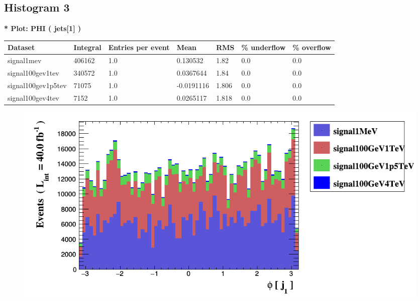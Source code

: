 \documentclass[a4paper, 10pt]{article}
\begin{document}
\subsection{ Histogram 3}

\textbf{* Plot: PHI ( jets[1] ) }\\
   \begin{table}[H]
  \begin{center}
    \begin{tabular}{|m{23.0mm}|m{23.0mm}|m{18.0mm}|m{19.0mm}|m{19.0mm}|m{19.0mm}|m{19.0mm}|}
      \hline
      {\cellcolor{yellow}         Dataset}& {\cellcolor{yellow}         Integral}& {\cellcolor{yellow}         Entries per event}& {\cellcolor{yellow}         Mean}& {\cellcolor{yellow}         RMS}& {\cellcolor{yellow}         \% underflow}& {\cellcolor{yellow}         \% overflow}\\
      \hline
      {\cellcolor{white}         signal1mev}& {\cellcolor{white}         406162}& {\cellcolor{white}         1.0}& {\cellcolor{white}         0.130532}& {\cellcolor{white}         1.82}& {\cellcolor{green}         0.0}& {\cellcolor{green}         0.0}\\
      \hline
      {\cellcolor{white}         signal100gev1tev}& {\cellcolor{white}         340572}& {\cellcolor{white}         1.0}& {\cellcolor{white}         0.0367644}& {\cellcolor{white}         1.84}& {\cellcolor{green}         0.0}& {\cellcolor{green}         0.0}\\
      \hline
      {\cellcolor{white}         signal100gev1p5tev}& {\cellcolor{white}         71075}& {\cellcolor{white}         1.0}& {\cellcolor{white}         -0.0191116}& {\cellcolor{white}         1.806}& {\cellcolor{green}         0.0}& {\cellcolor{green}         0.0}\\
      \hline
      {\cellcolor{white}         signal100gev4tev}& {\cellcolor{white}         7152}& {\cellcolor{white}         1.0}& {\cellcolor{white}         0.0265117}& {\cellcolor{white}         1.818}& {\cellcolor{green}         0.0}& {\cellcolor{green}         0.0}\\
\hline
    \end{tabular}
  \end{center}
\end{table}

\begin{figure}[H]
  \begin{center}
    \includegraphics[scale=0.45]{selection_2.png}\\
\caption{   }
  \end{center}
\end{figure}
      \newpage
\end{document}
